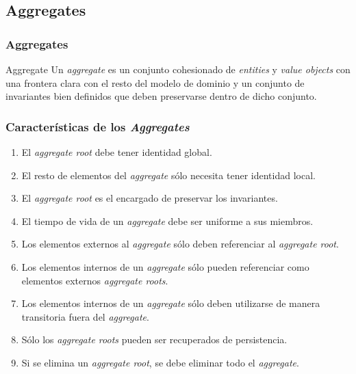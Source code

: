 \documentclass[handout,a4paper,slidestop,xcolor=pst,blue]{beamer}
\begin{document}
\subsection{Aggregates}

\begin{frame}[c]
    \frametitle{Aggregates}
    \begin{block}{Aggregate}
        Un \emph{aggregate} es un conjunto cohesionado de \emph{entities} y \emph{value objects} con una frontera clara con el resto del modelo de dominio y un conjunto de invariantes bien definidos que deben preservarse dentro de dicho conjunto.
    \end{block}
\end{frame}

\begin{frame}[c]
    \frametitle{Características de los \emph{Aggregates}}
    \begin{enumerate}[<+->]
        \item El \emph{aggregate root} debe tener identidad global.
        \item El resto de elementos del \emph{aggregate} sólo necesita tener identidad local.
        \item El \emph{aggregate root} es el encargado de preservar los invariantes.
        \item El tiempo de vida de un \emph{aggregate} debe ser uniforme a sus miembros.
        \item Los elementos externos al \emph{aggregate} sólo deben referenciar al \emph{aggregate root}.
        \item Los elementos internos de un \emph{aggregate} sólo pueden referenciar como elementos externos \emph{aggregate roots}.
        \item Los elementos internos de un \emph{aggregate} sólo deben utilizarse de manera transitoria fuera del \emph{aggregate}.
        \item Sólo los \emph{aggregate roots} pueden ser recuperados de persistencia.
        \item Si se elimina un \emph{aggregate root}, se debe eliminar todo el \emph{aggregate}.
    \end{enumerate}
\end{frame}
\end{document}
